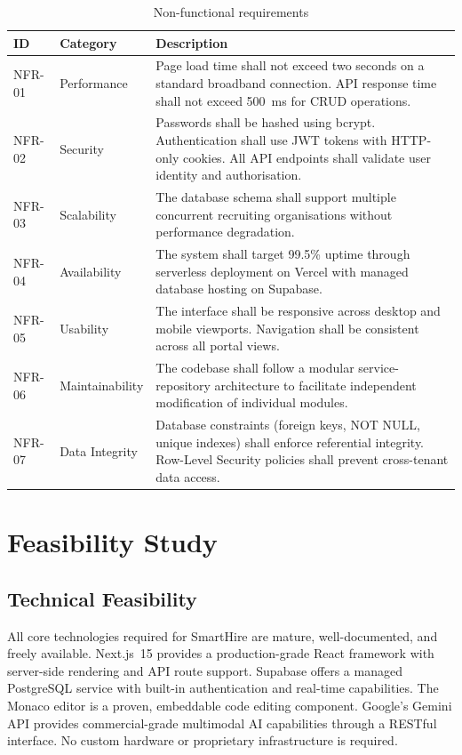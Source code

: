 \begin{table}[htbp]
\centering
\caption{Non-functional requirements}
\label{tab:nfr}
\small
\begin{tabular}{p{0.8in}p{1.2in}p{3.5in}}
\toprule
\textbf{ID} & \textbf{Category} & \textbf{Description} \\
\midrule
NFR-01 & Performance   & Page load time shall not exceed two seconds on a standard broadband connection. API response time shall not exceed 500~ms for CRUD operations. \\
NFR-02 & Security      & Passwords shall be hashed using bcrypt. Authentication shall use JWT tokens with HTTP-only cookies. All API endpoints shall validate user identity and authorisation. \\
NFR-03 & Scalability   & The database schema shall support multiple concurrent recruiting organisations without performance degradation. \\
NFR-04 & Availability  & The system shall target 99.5\% uptime through serverless deployment on Vercel with managed database hosting on Supabase. \\
NFR-05 & Usability     & The interface shall be responsive across desktop and mobile viewports. Navigation shall be consistent across all portal views. \\
NFR-06 & Maintainability & The codebase shall follow a modular service-repository architecture to facilitate independent modification of individual modules. \\
NFR-07 & Data Integrity & Database constraints (foreign keys, NOT NULL, unique indexes) shall enforce referential integrity. Row-Level Security policies shall prevent cross-tenant data access. \\
\bottomrule
\end{tabular}
\end{table}

\section{Feasibility Study}
\label{sec:feasibility}

\subsection{Technical Feasibility}

All core technologies required for SmartHire are mature, well-documented, and freely available. Next.js~15 provides a production-grade React framework with server-side rendering and API route support. Supabase offers a managed PostgreSQL service with built-in authentication and real-time capabilities. The Monaco editor is a proven, embeddable code editing component. Google's Gemini API provides commercial-grade multimodal AI capabilities through a RESTful interface. No custom hardware or proprietary infrastructure is required.

